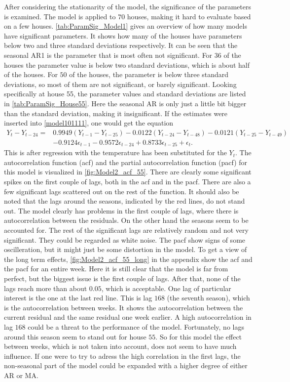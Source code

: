 \noindent After considering the stationarity of the model, the significance of the parameters is examined. The model is applied to $70$ houses, making it hard to evaluate based on a few houses. \cref{tab:ParamSig_Model1} gives an overview of how many models have significant parameters. It shows how many of the houses have parameters below two and three standard deviations respectively. It can be seen that the seasonal AR1 is the parameter that is most often not significant. For $36$ of the houses the parameter value is below two standard deviations, which is about half of the houses. For $50$ of the houses, the parameter is below three standard deviations, so most of them are not significant, or barely significant. Looking specifically at house 55, the parameter values and standard deviations are listed in \cref{tab:ParamSig_House55}. Here the seasonal AR is only just a little bit bigger than the standard deviation, making it insignificant. If the estimates were inserted into \cref{model101111}, one would get the equation
\begin{align}
    Y_t-Y_{t-24} = &0.9949 (Y_{t-1}-Y_{t-25}) - 0.0122 (Y_{t-24}-Y_{t-48}) - 0.0121  (Y_{t-25}-Y_{t-49}) \\  &- 0.9124 \epsilon_{t-1} -0.9572 \epsilon_{t-24} + 0.8733 \epsilon_{t-25} + \epsilon_t. \nonumber
\end{align}
This is after regression with the temperature has been substituted for the $Y_t$. The autocorrelation function (acf) and the partial autocorrelation function (pacf) for this model is visualized in \cref{fig:Model2_acf_55}. There are clearly some significant spikes on the first couple of lags, both in the acf and in the pacf. There are also a few significant lags scattered out on the rest of the function. It should also be noted that the lags around the seasons, indicated by the red lines, do not stand out. The model clearly has problems in the first couple of lags, where there is autocorrelation between the residuals. On the other hand the seasons seem to be accounted for. The rest of the significant lags are relatively random and not very significant. They could be regarded as white noise. The pacf show signs of some oscilleration, but it might just be some distortion in the model. To get a view of the long term effects, \cref{fig:Model2_acf_55_long} in the appendix show the acf and the pacf for an entire week. Here it is still clear that the model is far from perfect, but the biggest issue is the first couple of lags. After that, none of the lags reach more than about $0.05$, which is acceptable. One lag of particular interest is the one at the last red line. This is lag $168$ (the seventh season), which is the autocorrelation between weeks. It shows the autocorrelation between the current residual and the same residual one week earlier. A high autocorrelation in lag $168$ could be a threat to the performance of the model. Fortunately, no lags around this season seem to stand out for house $55$. So for this model the effect between weeks, which is not taken into account, does not seem to have much influence. If one were to try to adress the high correlation in the first lags, the non-seasonal part of the model could be expanded with a higher degree of either AR or MA.


